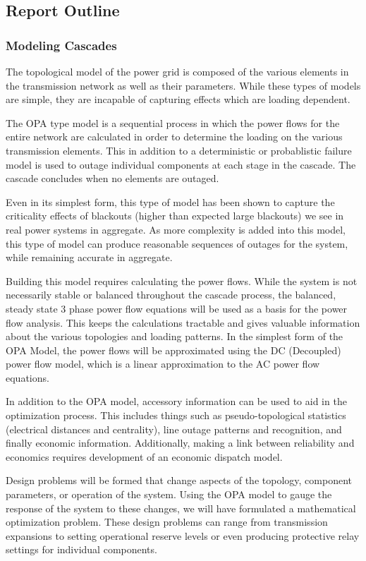 \subsection{Report Outline}

\subsubsection{Modeling Cascades}
The topological model of the power grid is composed of the various elements in the transmission network as well as their parameters.  While these types of models are simple, they are incapable of capturing effects which are loading dependent. 

The OPA type model is a sequential process in which the power flows for the entire network are calculated in order to determine the loading on the various transmission elements.  This in addition to a deterministic or probablistic failure model is used to outage individual components at each stage in the cascade.  The cascade concludes when no elements are outaged.

Even in its simplest form, this type of model has been shown to capture the criticality effects of blackouts (higher than expected large blackouts) we see in real power systems in aggregate.  As more complexity is added into this model, this type of model can produce reasonable sequences of outages for the system, while remaining accurate in aggregate. 

Building this model requires calculating the power flows.  While the system is not necessarily stable or balanced throughout the cascade process, the balanced, steady state 3 phase power flow equations will be used as a basis for the power flow analysis.  This keeps the calculations tractable and gives valuable information about the various topologies and loading patterns.  In the simplest form of the OPA Model, the power flows will be approximated using the DC (Decoupled) power flow model, which is a linear approximation to the AC power flow equations.

In addition to the OPA model, accessory information can be used to aid in the optimization process.  This includes things such as pseudo-topological statistics (electrical distances and centrality), line outage patterns and recognition, and finally economic information.  Additionally, making a link between reliability and economics requires development of an economic dispatch model.

Design problems will be formed that change aspects of the topology, component parameters, or operation of the system.  Using the OPA model to gauge the response of the system to these changes, we will have formulated a mathematical optimization problem.  These design problems can range from transmission expansions to setting operational reserve levels or even producing protective relay settings for individual components.

